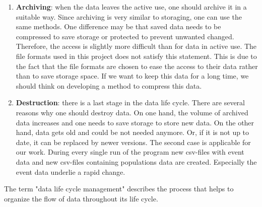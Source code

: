 \begin{enumerate}
	\item \textbf{Archiving}: when the data leaves the active use, one should archive it in a suitable way. Since archiving is very similar to storaging, one can use the same methods. One difference may be that saved data needs to be compressed to save storage or protected to prevent unwanted changed. Therefore, the access is slightly more difficult than for data in active use. The file formats used in this project does not satisfy this statement. This is due to the fact that the file formats are chosen to ease the access to their data rather than to save storage space. If we want to keep this data for a long time, we should think on developing a method to compress this data.
	\item \textbf{Destruction}:  there is a last stage in the data life cycle. There are several reasons why one should destroy data. On one hand, the volume of archived data increases and one needs to save storage to store new data. On the other hand, data gets old and could be not needed anymore. Or, if it is not up to date, it can be replaced by newer versions. The second case is applicable for our work. During every single run of the program new csv-files with event data and new csv-files containing populations data are created. Especially the event data underlie a rapid change.
\end{enumerate}

The term "data life cycle management" describes the process that helps to organize the flow of data throughout its life cycle.